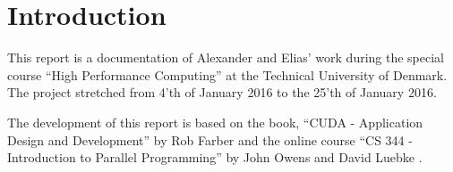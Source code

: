 \chapter{Introduction}
\label{chap:introduction}

This report is a documentation of Alexander and Elias' work during the special course ``High Performance Computing'' at the Technical University of Denmark.
The project stretched from 4'th of January 2016 to the 25'th of January 2016.

The development of this report is based on the book, ``CUDA - Application Design and Development'' by Rob Farber \cite{farber2011cuda} and the online course ``CS 344 - Introduction to Parallel Programming'' by John Owens and David Luebke \cite{udacity}.




